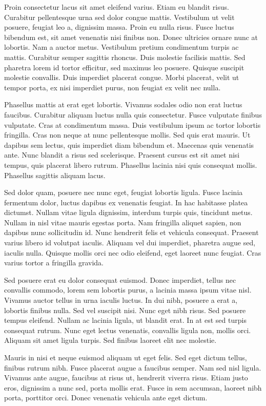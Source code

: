 \documentclass[a4paper]{article}
\begin{document}
Proin consectetur lacus sit amet eleifend varius. Etiam eu blandit risus. Curabitur pellentesque urna sed dolor congue mattis. Vestibulum ut velit posuere, feugiat leo a, dignissim massa. Proin eu nulla risus. Fusce luctus bibendum est, sit amet venenatis nisi finibus non. Donec ultricies ornare nunc at lobortis. Nam a auctor metus. Vestibulum pretium condimentum turpis ac mattis. Curabitur semper sagittis rhoncus. Duis molestie facilisis mattis. Sed pharetra lorem id tortor efficitur, sed maximus leo posuere. Quisque suscipit molestie convallis. Duis imperdiet placerat congue. Morbi placerat, velit ut tempor porta, ex nisi imperdiet purus, non feugiat ex velit nec nulla.

Phasellus mattis at erat eget lobortis. Vivamus sodales odio non erat luctus faucibus. Curabitur aliquam luctus nulla quis consectetur. Fusce vulputate finibus vulputate. Cras at condimentum massa. Duis vestibulum ipsum ac tortor lobortis fringilla. Cras non neque at nunc pellentesque mollis. Sed quis erat mauris. Ut dapibus sem lectus, quis imperdiet diam bibendum et. Maecenas quis venenatis ante. Nunc blandit a risus sed scelerisque. Praesent cursus est sit amet nisi tempus, quis placerat libero rutrum. Phasellus lacinia nisi quis consequat mollis. Phasellus sagittis aliquam lacus.

Sed dolor quam, posuere nec nunc eget, feugiat lobortis ligula. Fusce lacinia fermentum dolor, luctus dapibus ex venenatis feugiat. In hac habitasse platea dictumst. Nullam vitae ligula dignissim, interdum turpis quis, tincidunt metus. Nullam in nisl vitae mauris egestas porta. Nam fringilla aliquet sapien, non dapibus nunc sollicitudin id. Nunc hendrerit felis et vehicula consequat. Praesent varius libero id volutpat iaculis. Aliquam vel dui imperdiet, pharetra augue sed, iaculis nulla. Quisque mollis orci nec odio eleifend, eget laoreet nunc feugiat. Cras varius tortor a fringilla gravida.

Sed posuere erat eu dolor consequat euismod. Donec imperdiet, tellus nec convallis commodo, lorem sem lobortis purus, a lacinia massa ipsum vitae nisl. Vivamus auctor tellus in urna iaculis luctus. In dui nibh, posuere a erat a, lobortis finibus nulla. Sed vel suscipit nisi. Nunc eget nibh risus. Sed posuere tempus eleifend. Nullam ac lacinia ligula, ut blandit erat. In at est sed turpis consequat rutrum. Nunc eget lectus venenatis, convallis ligula non, mollis orci. Aliquam sit amet ligula turpis. Sed finibus laoreet elit nec molestie.

Mauris in nisi et neque euismod aliquam ut eget felis. Sed eget dictum tellus, finibus rutrum nibh. Fusce placerat augue a faucibus semper. Nam sed nisl ligula. Vivamus ante augue, faucibus at risus ut, hendrerit viverra risus. Etiam justo eros, dignissim a nunc sed, porta mollis erat. Fusce in sem accumsan, laoreet nibh porta, porttitor orci. Donec venenatis vehicula ante eget dictum.
\end{document}
